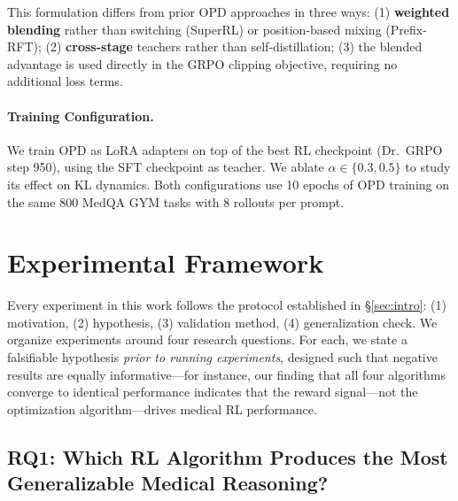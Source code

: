 \documentclass{article}
\begin{document}
This formulation differs from prior OPD approaches in three ways: (1) \textbf{weighted blending} rather than switching (SuperRL) or position-based mixing (Prefix-RFT); (2) \textbf{cross-stage} teachers rather than self-distillation; (3) the blended advantage is used directly in the GRPO clipping objective, requiring no additional loss terms.

\paragraph{Training Configuration.}
We train OPD as LoRA adapters on top of the best RL checkpoint (Dr.~GRPO step 950), using the SFT checkpoint as teacher. We ablate $\alpha \in \{0.3, 0.5\}$ to study its effect on KL dynamics. Both configurations use 10 epochs of OPD training on the same 800 MedQA GYM tasks with 8 rollouts per prompt.


\section{Experimental Framework}
\label{sec:experiments}

Every experiment in this work follows the protocol established in \S\ref{sec:intro}: (1) motivation, (2) hypothesis, (3) validation method, (4) generalization check. We organize experiments around four research questions. For each, we state a falsifiable hypothesis \emph{prior to running experiments}, designed such that negative results are equally informative---for instance, our finding that all four algorithms converge to identical performance indicates that the reward signal---not the optimization algorithm---drives medical RL performance.

\subsection{RQ1: Which RL Algorithm Produces the Most Generalizable Medical Reasoning?}
\label{sec:rq1}
\end{document}
